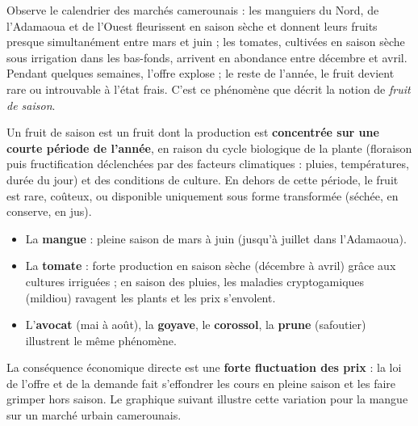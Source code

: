 \documentclass[11pt]{article}
\newcommand{\cle}[1]{{\popxbold\color{popdark}#1}}
\newcounter{popsec}
\newcounter{popsub}
\newcommand{\courssub}[1]{%
  \stepcounter{popsub}%
  \par\vspace{9pt}\noindent{\popxbold\fontsize{11.5}{13}\selectfont\color{popink}{\color{poporange}\thepopsec.\thepopsub}\hspace{6pt}#1}\par\nopagebreak\vspace{4pt}
}
\begin{document}
\courssub{La notion de fruit de saison}

Observe le calendrier des marchés camerounais : les manguiers du Nord, de l'Adamaoua et de l'Ouest fleurissent en saison sèche et donnent leurs fruits presque simultanément entre mars et juin ; les tomates, cultivées en saison sèche sous irrigation dans les bas-fonds, arrivent en abondance entre décembre et avril. Pendant quelques semaines, l'offre explose ; le reste de l'année, le fruit devient rare ou introuvable à l'état frais. C'est ce phénomène que décrit la notion de \emph{fruit de saison}.

\begin{definition}
Un \cle{fruit de saison} est un fruit dont la production est \textbf{concentrée sur une courte période de l'année}, en raison du cycle biologique de la plante (floraison puis fructification déclenchées par des facteurs climatiques : pluies, températures, durée du jour) et des conditions de culture. En dehors de cette période, le fruit est rare, coûteux, ou disponible uniquement sous forme transformée (séchée, en conserve, en jus).
\end{definition}

\begin{exemplebox}
\begin{itemize}
\item La \textbf{mangue} : pleine saison de mars à juin (jusqu'à juillet dans l'Adamaoua).
\item La \textbf{tomate} : forte production en saison sèche (décembre à avril) grâce aux cultures irriguées ; en saison des pluies, les maladies cryptogamiques (mildiou) ravagent les plants et les prix s'envolent.
\item L'\textbf{avocat} (mai à août), la \textbf{goyave}, le \textbf{corossol}, la \textbf{prune} (safoutier) illustrent le même phénomène.
\end{itemize}
\end{exemplebox}

La conséquence économique directe est une \textbf{forte fluctuation des prix} : la loi de l'offre et de la demande fait s'effondrer les cours en pleine saison et les faire grimper hors saison. Le graphique suivant illustre cette variation pour la mangue sur un marché urbain camerounais.
\end{document}
